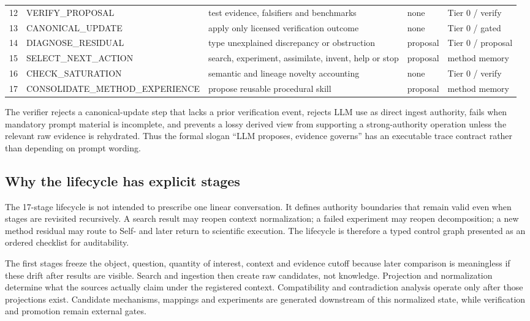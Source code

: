 \begin{table}[H]
\begin{tabularx}{\textwidth}{@{}r l Y l l@{}}
12 & VERIFY\_PROPOSAL & test evidence, falsifiers and benchmarks & none & Tier 0 / verify \\
13 & CANONICAL\_UPDATE & apply only licensed verification outcome & none & Tier 0 / gated \\
14 & DIAGNOSE\_RESIDUAL & type unexplained discrepancy or obstruction & proposal & Tier 0 / proposal \\
15 & SELECT\_NEXT\_ACTION & search, experiment, assimilate, invent, help or stop & proposal & method memory \\
16 & CHECK\_SATURATION & semantic and lineage novelty accounting & none & Tier 0 / verify \\
17 & CONSOLIDATE\_METHOD\_EXPERIENCE & propose reusable procedural skill & proposal & method memory \\
\bottomrule
\end{tabularx}
\end{table}

The verifier rejects a canonical-update step that lacks a prior verification event, rejects LLM use as direct ingest authority, fails when mandatory prompt material is incomplete, and prevents a lossy derived view from supporting a strong-authority operation unless the relevant raw evidence is rehydrated. Thus the formal slogan ``LLM proposes, evidence governs'' has an executable trace contract rather than depending on prompt wording.

\subsection{Why the lifecycle has explicit stages}

The 17-stage lifecycle is not intended to prescribe one linear conversation. It defines authority boundaries that remain valid even when stages are revisited recursively. A search result may reopen context normalization; a failed experiment may reopen decomposition; a new method residual may route to Self-\RAKL{} and later return to scientific execution. The lifecycle is therefore a typed control graph presented as an ordered checklist for auditability.

The first stages freeze the object, question, quantity of interest, context and evidence cutoff because later comparison is meaningless if these drift after results are visible. Search and ingestion then create raw candidates, not knowledge. Projection and normalization determine what the sources actually claim under the registered context. Compatibility and contradiction analysis operate only after those projections exist. Candidate mechanisms, mappings and experiments are generated downstream of this normalized state, while verification and promotion remain external gates.

